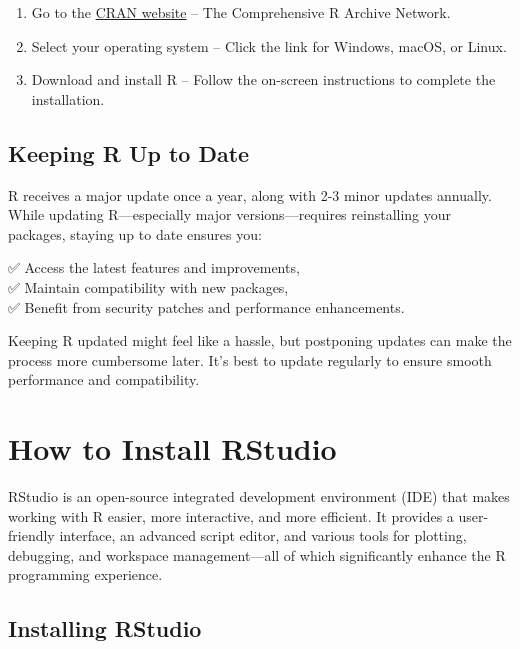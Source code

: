 \documentclass[
  11pt,
]{book}
\providecommand{\tightlist}{%
  \setlength{\itemsep}{0pt}\setlength{\parskip}{0pt}}
\theoremstyle{definition}
\theoremstyle{definition}
\theoremstyle{definition}
\theoremstyle{definition}
\theoremstyle{remark}
\begin{document}
\begin{enumerate}
\def\labelenumi{\arabic{enumi}.}
\tightlist
\item
  Go to the \href{https://cran.r-project.org}{CRAN website} -- The Comprehensive R Archive Network.\\
\item
  Select your operating system -- Click the link for Windows, macOS, or Linux.\\
\item
  Download and install R -- Follow the on-screen instructions to complete the installation.
\end{enumerate}

\subsection*{Keeping R Up to Date}\label{keeping-r-up-to-date}


R receives a major update once a year, along with 2-3 minor updates annually. While updating R---especially major versions---requires reinstalling your packages, staying up to date ensures you:

✅ Access the latest features and improvements,\\
✅ Maintain compatibility with new packages,\\
✅ Benefit from security patches and performance enhancements.

Keeping R updated might feel like a hassle, but postponing updates can make the process more cumbersome later. It's best to update regularly to ensure smooth performance and compatibility.

\section{How to Install RStudio}\label{how-to-install-rstudio}

RStudio is an open-source integrated development environment (IDE) that makes working with R easier, more interactive, and more efficient. It provides a user-friendly interface, an advanced script editor, and various tools for plotting, debugging, and workspace management---all of which significantly enhance the R programming experience.

\subsection*{Installing RStudio}\label{installing-rstudio}
\end{document}

